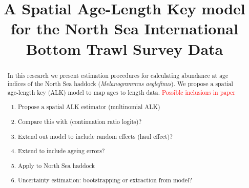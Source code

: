 \documentclass[a4paper 12pt]{article}
\title{\bf 
}
\author{}
\date{}
\numberwithin{equation}{section}
\newcommand{\ed}[1]{\textcolor{red}{#1}}
\begin{document}
\title{A Spatial Age-Length Key model for the North Sea International Bottom Trawl Survey Data}

\maketitle


\begin{abstract}

In this research we present estimation procedures for calculating abundance at age indices of the North Sea haddock (\textit{Melanogrammus aeglefinus}). We propose a spatial age-length key (ALK) model to map ages to length data.  \ed{Possible inclusions in paper}

\begin{enumerate}
\item Propose a spatial ALK estimator (multinomial ALK)
\item Compare this with \citep{berg2012spatial} (continuation ratio logits)? 
\item Extend out model to include random effects (haul effect)?
\item Extend to include ageing errors?
\item Apply to North Sea haddock
\item Uncertainty estimation: bootstrapping or extraction from model?
\end{enumerate}

\end{abstract}

 
\end{document}
